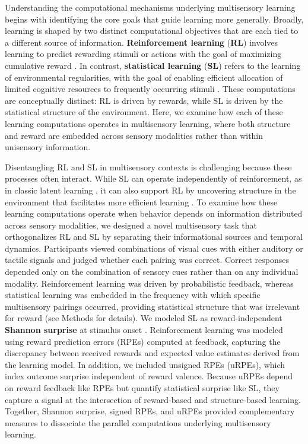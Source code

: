 \documentclass{article}
\begin{document}
Understanding the computational mechanisms underlying multisensory learning begins with identifying the core goals that guide learning more generally. Broadly, learning is shaped by two distinct computational objectives that are each tied to a different source of information. \textbf{Reinforcement learning} (\textbf{RL}) involves learning to predict rewarding stimuli or actions \cite{yerkes1909method, skinner1935two} with the goal of maximizing cumulative reward \cite{sutton2018reinforcement}. In contrast, \textbf{statistical learning} (\textbf{SL}) refers to the learning of environmental regularities, with the goal of enabling efficient allocation of limited cognitive resources to frequently occurring stimuli \cite{barlow1961possible, simoncelli2001natural, geisler2008visual}. These computations are conceptually distinct: RL is driven by rewards, while SL is driven by the statistical structure of the environment. Here, we examine how each of these learning computations operates in multisensory learning, where both structure and reward are embedded across sensory modalities rather than within unisensory information.\newline

Disentangling RL and SL in multisensory contexts is challenging because these processes often interact. While SL can operate independently of reinforcement, as in classic latent learning \cite{tolman1948cognitive}, it can also support RL by uncovering structure in the environment that facilitates more efficient learning \cite{botvinick2015reinforcement, solway2014optimal, lai2022action, dayan1993improving, gershman2018successor}. To examine how these learning computations operate when behavior depends on information distributed across sensory modalities, we designed a novel multisensory task that orthogonalizes RL and SL by separating their informational sources and temporal dynamics. Participants viewed combinations of visual cues with either auditory or tactile signals and judged whether each pairing was correct. Correct responses depended only on the combination of sensory cues rather than on any individual modality. Reinforcement learning was driven by probabilistic feedback, whereas statistical learning was embedded in the frequency with which specific multisensory pairings occurred, providing statistical structure that was irrelevant for reward (see Methods for details). We modeled SL as reward-independent \textbf{Shannon surprise} \cite{6773024} at stimulus onset \cite{bornstein2012dissociating, otto2013curse, konovalov2016gaze, konovalov2018neurocomputational}. Reinforcement learning was modeled using reward prediction errors (RPEs) computed at feedback, capturing the discrepancy between received rewards and expected value estimates derived from the learning model. In addition, we included unsigned RPEs (uRPEs), which index outcome surprise independent of reward valence. Because uRPEs depend on reward feedback like RPEs but quantify statistical surprise like SL, they capture a signal at the intersection of reward-based and structure-based learning. Together, Shannon surprise, signed RPEs, and uRPEs provided complementary measures to dissociate the parallel computations underlying multisensory learning.\newline
\end{document}
